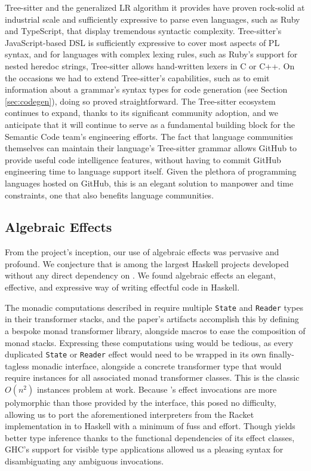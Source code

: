 \documentclass[acmsmall,fleqn,12pt]{acmart}
\begin{document}
Tree-sitter and the generalized LR algorithm it provides have proven
rock-solid at industrial scale and sufficiently expressive to parse even
languages, such as Ruby and TypeScript, that display tremendous syntactic
complexity. Tree-sitter's JavaScript-based DSL is sufficiently expressive to
cover most aspects of PL syntax, and for languages with complex lexing
rules, such as Ruby's support for nested heredoc strings, Tree-sitter allows
hand-written lexers in C or C++. On the occasions we had to extend
Tree-sitter's capabilities, such as to emit information about a grammar's
syntax types for code generation (see Section \ref{sec:codegen}), doing so
proved straightforward. The Tree-sitter ecosystem continues to expand,
thanks to its significant community adoption, and we anticipate that it will
continue to serve as a fundamental building block for the Semantic Code
team's engineering efforts. The fact that language communities themselves
can maintain their language's Tree-sitter grammar allows GitHub to provide
useful code intelligence features, without having to commit GitHub
engineering time to language support itself. Given the plethora of
programming languages hosted on GitHub, this is an elegant solution to
manpower and time constraints, one that also benefits language communities.

\subsection{Algebraic Effects}

From the project's inception, our use of algebraic effects was pervasive and
profound. We conjecture that \semantic{} is among the largest Haskell projects
developed without any direct dependency on \mtl{}. We found algebraic effects an
elegant, effective, and expressive way of writing effectful code in Haskell.

The monadic computations described in \citet{Darais17Abstracting} require
multiple \texttt{State} and \texttt{Reader} types in their transformer stacks,
and the paper's artifacts accomplish this by defining a bespoke monad
transformer library, alongside macros to ease the composition of monad stacks.
Expressing these computations using \mtl{} would be tedious, as every duplicated
\texttt{State} or \texttt{Reader} effect would need to be wrapped in its own
finally-tagless monadic interface, alongside a concrete transformer type that
would require instances for all associated monad transformer classes. This is
the classic $O(n^2)$ instances problem at work. Because \fe{}'s effect
invocations are more polymorphic than those provided by the \mtl{} interface,
this posed no difficulty, allowing us to port the aforementioned interpreters
from the Racket implementation in \citet{Darais17Abstracting} to Haskell with a
minimum of fuss and effort. Though \mtl{} yields better type inference thanks
to the functional dependencies of its effect classes, GHC's support
for visible type applications \cite{eisenberg16visible} allowed us a pleasing
syntax for disambiguating any ambiguous invocations.
\end{document}
